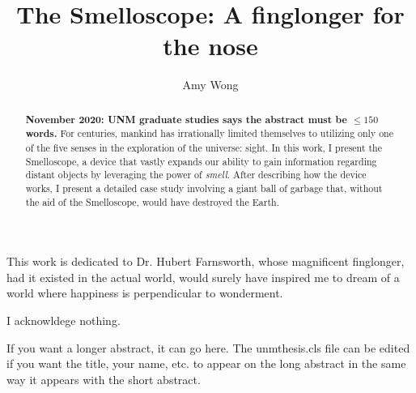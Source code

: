 \documentclass[singlespace]{../unmthesis}
\title{The Smelloscope: A finglonger for the nose}
\author{Amy Wong}
\begin{document}
\frontmatter

\makeapproval %

\maketitle		%

\begin{dedication}	%
This work is dedicated to Dr. Hubert Farnsworth, whose magnificent finglonger, had it 
existed in the actual world, would surely have inspired 
me to dream of a world where happiness is perpendicular to wonderment.
\end{dedication}

\begin{acknowledgements} %
I acknowldege nothing.
\end{acknowledgements}

\begin{abstract} %
\textbf{November 2020: UNM graduate studies says the abstract must be $\leq 150$ words.}
For centuries, mankind has irrationally limited themselves to utilizing only one 
of the five senses in the exploration of the universe: sight. In this 
work, I present the Smelloscope, a device that vastly expands our ability to gain information 
regarding distant objects by leveraging the power of \emph{smell}. 
After describing how the device works, I present a detailed case 
study involving a giant ball of garbage that, without the aid of the Smelloscope, would have 
destroyed the Earth.
\end{abstract}

\begin{longabstract}
If you want a longer abstract, it can go here. The unmthesis.cls file can be 
edited if you want the title, your name, etc. to appear on the long abstract 
in the same way it appears with the short abstract.
\end{longabstract}

\makecontents %

%
%

\bodyofwork

%
%
%
\end{document}
